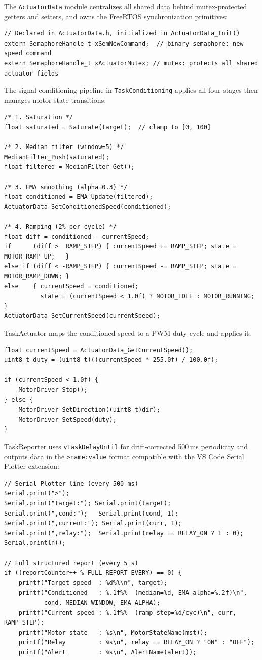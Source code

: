 The \texttt{ActuatorData} module centralizes all shared data behind mutex-protected
getters and setters, and owns the FreeRTOS synchronization primitives:

\begin{lstlisting}
// Declared in ActuatorData.h, initialized in ActuatorData_Init()
extern SemaphoreHandle_t xSemNewCommand;  // binary semaphore: new speed command
extern SemaphoreHandle_t xActuatorMutex; // mutex: protects all shared actuator fields
\end{lstlisting}

The signal conditioning pipeline in \texttt{TaskConditioning} applies all four stages
then manages motor state transitions:
\begin{lstlisting}
/* 1. Saturation */
float saturated = Saturate(target);  // clamp to [0, 100]

/* 2. Median filter (window=5) */
MedianFilter_Push(saturated);
float filtered = MedianFilter_Get();

/* 3. EMA smoothing (alpha=0.3) */
float conditioned = EMA_Update(filtered);
ActuatorData_SetConditionedSpeed(conditioned);

/* 4. Ramping (2% per cycle) */
float diff = conditioned - currentSpeed;
if      (diff >  RAMP_STEP) { currentSpeed += RAMP_STEP; state = MOTOR_RAMP_UP;   }
else if (diff < -RAMP_STEP) { currentSpeed -= RAMP_STEP; state = MOTOR_RAMP_DOWN; }
else    { currentSpeed = conditioned;
          state = (currentSpeed < 1.0f) ? MOTOR_IDLE : MOTOR_RUNNING; }
ActuatorData_SetCurrentSpeed(currentSpeed);
\end{lstlisting}

TaskActuator maps the conditioned speed to a PWM duty cycle and applies it:
\begin{lstlisting}
float currentSpeed = ActuatorData_GetCurrentSpeed();
uint8_t duty = (uint8_t)((currentSpeed * 255.0f) / 100.0f);

if (currentSpeed < 1.0f) {
    MotorDriver_Stop();
} else {
    MotorDriver_SetDirection((uint8_t)dir);
    MotorDriver_SetSpeed(duty);
}
\end{lstlisting}

TaskReporter uses \texttt{vTaskDelayUntil} for drift-corrected 500\,ms periodicity
and outputs data in the \texttt{>name:value} format compatible with the VS Code
Serial Plotter extension:
\begin{lstlisting}
// Serial Plotter line (every 500 ms)
Serial.print(">");
Serial.print("target:"); Serial.print(target);
Serial.print(",cond:");   Serial.print(cond, 1);
Serial.print(",current:"); Serial.print(curr, 1);
Serial.print(",relay:");  Serial.print(relay == RELAY_ON ? 1 : 0);
Serial.println();

// Full structured report (every 5 s)
if ((reportCounter++ % FULL_REPORT_EVERY) == 0) {
    printf("Target speed  : %d%%\n", target);
    printf("Conditioned   : %.1f%%  (median=%d, EMA alpha=%.2f)\n",
           cond, MEDIAN_WINDOW, EMA_ALPHA);
    printf("Current speed : %.1f%%  (ramp step=%d/cyc)\n", curr, RAMP_STEP);
    printf("Motor state   : %s\n", MotorStateName(mst));
    printf("Relay         : %s\n", relay == RELAY_ON ? "ON" : "OFF");
    printf("Alert         : %s\n", AlertName(alert));
\end{lstlisting}
